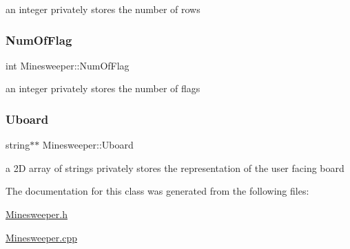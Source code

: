 an integer privately stores the number of rows \mbox{\label{classMinesweeper_aa11ba428693510b67f95979f6762b8c6}} 
\subsubsection{\texorpdfstring{Num\+Of\+Flag}{NumOfFlag}}
{\footnotesize\ttfamily int Minesweeper\+::\+Num\+Of\+Flag\hspace{0.3cm}{\ttfamily [private]}}

an integer privately stores the number of flags \mbox{\label{classMinesweeper_ac8e42ed2ff1dccc35d9a9529ffafe9a4}} 
\subsubsection{\texorpdfstring{Uboard}{Uboard}}
{\footnotesize\ttfamily string$\ast$$\ast$ Minesweeper\+::\+Uboard\hspace{0.3cm}{\ttfamily [private]}}

a 2D array of strings privately stores the representation of the user facing board 

The documentation for this class was generated from the following files\+:\begin{DoxyCompactItemize}
\item 
\hyperlink{Minesweeper_8h}{Minesweeper.\+h}\item 
\hyperlink{Minesweeper_8cpp}{Minesweeper.\+cpp}\end{DoxyCompactItemize}
